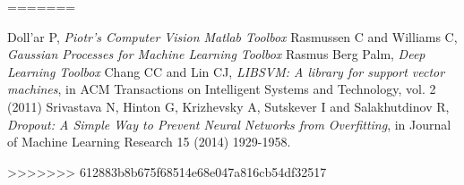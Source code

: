 \documentclass{article}
\begin{document}
=======

  \begin{thebibliography}{99}

     Doll'ar P, \textit{Piotr's Computer Vision Matlab Toolbox}
     Rasmussen C and Williams C, \textit{Gaussian Processes for Machine Learning Toolbox}
  	 Rasmus Berg Palm, \textit{Deep Learning Toolbox}
  	 Chang CC and Lin CJ, \textit{LIBSVM: A library for support vector machines}, in ACM Transactions on Intelligent Systems and Technology, vol. 2 (2011)
  	 Srivastava N, Hinton G, Krizhevsky A, Sutskever I and Salakhutdinov R, \textit{Dropout: A Simple Way to Prevent Neural Networks from Overfitting}, in Journal of Machine Learning Research 15 (2014) 1929-1958.

  \end{thebibliography}

>>>>>>> 612883b8b675f68514e68e047a816cb54df32517
\end{document}
